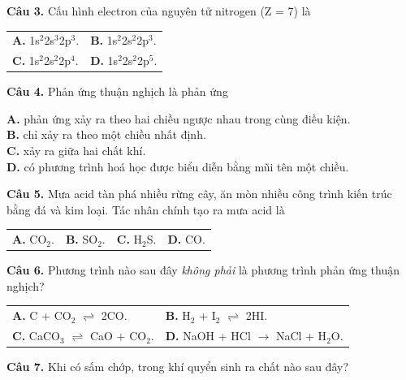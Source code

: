 \documentclass[13pt,a4paper]{article}
\begin{document}
\textbf{Câu 3.} Cấu hình electron của nguyên tử nitrogen (Z = 7) là

\begin{tabularx}{\textwidth}{@{}XX@{}}
\textbf{A.} 1s$^{2}$2s$^{3}$2p$^{3}$. & \textbf{B.} 1s$^{2}$2s$^{2}$2p$^{3}$. \\
\textbf{C.} 1s$^{2}$2s$^{2}$2p$^{4}$. & \textbf{D.} 1s$^{2}$2s$^{2}$2p$^{5}$. \\
\end{tabularx}

\vspace{1.6cm}

\textbf{Câu 4.} Phản ứng thuận nghịch là phản ứng

\quad \textbf{A.} phản ứng xảy ra theo hai chiều ngược nhau trong cùng điều kiện.\\
\quad \textbf{B.} chỉ xảy ra theo một chiều nhất định.\\
\quad \textbf{C.} xảy ra giữa hai chất khí.\\
\quad \textbf{D.} có phương trình hoá học được biểu diễn bằng mũi tên một chiều.\\

\vspace{1.6cm}

\textbf{Câu 5.} Mưa acid tàn phá nhiều rừng cây, ăn mòn nhiều công trình kiến trúc bằng đá và kim loại. Tác nhân chính tạo ra mưa acid là

\begin{tabularx}{\textwidth}{@{}XXXX@{}}
\textbf{A.} CO$_{2}$. & \textbf{B.} SO$_{2}$. & \textbf{C.} H$_{2}$S. & \textbf{D.} CO. \\
\end{tabularx}

\vspace{1.6cm}

\textbf{Câu 6.} Phương trình nào sau đây \textit{không phải} là phương trình phản ứng thuận nghịch?

\begin{tabularx}{\textwidth}{@{}XX@{}}
\textbf{A.} C + CO$_{2}$ $\rightleftharpoons$ 2CO. & \textbf{B.} H$_{2}$ + I$_{2}$ $\rightleftharpoons$ 2HI. \\
\textbf{C.} CaCO$_{3}$ $\rightleftharpoons$ CaO + CO$_{2}$. & \textbf{D.} NaOH + HCl $\longrightarrow$ NaCl + H$_{2}$O. \\
\end{tabularx}

\vspace{1.6cm}

\textbf{Câu 7.} Khi có sấm chớp, trong khí quyển sinh ra chất nào sau đây?
\end{document}
